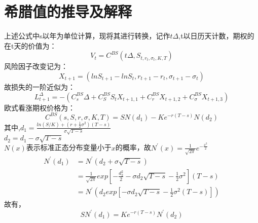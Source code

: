 \documentclass{article}
\begin{document}
\section{希腊值的推导及解释}
上述公式中s以年为单位计算，现将其进行转换，记作$ t\Delta $,t以日历天计数，期权的在t天的价值为：\\
\[V_{t}= C^{BS}(t\Delta, S_{t, r_{t}, \sigma_{t}, K, T})\]
风险因子改变记为：\
\[X_{t+1}= (lnS_{t+1}-lnS_{t}, r_{t+1}-r_{t}, \sigma_{t+1}-\sigma_{t})\]
故损失的一阶近似为：\
\[L^{\Delta}_{t+1}= -(C^{BS}_{s}\Delta + C^{BS}_{S}S_{t}X_{t+1,1}
+ C^{BS}_{r}X_{t+1,2}+ C^{BS}_{\sigma}X_{t+1,3})\]
欧式看涨期权价格为：
\[C^{BS}(s,S,r,\sigma,K,T) = SN(d_{1})-Ke^{-r(T-s)}N(d_{2})\]
其中,$ d_{1}=\frac{ln(S/K)+
	(r+\frac{1}{2}\sigma^{2})(T-s)}{\sigma\sqrt{T-s}}$\\
$d_{2} = d_{1}-\sigma\sqrt{T-s}$\\
$N(x)$表示标准正态分布变量小于$ x $的概率，故$ N^{'}(x)= \frac{1}{\sqrt{2\pi}} e^{-\frac{x^2}{2}}$
\begin{align}
\nonumber N^{'}(d_{1}) & = N^{'}(d_{2}+\sigma\sqrt{T-s})\\
\nonumber  & = \frac{1}{\sqrt{2\pi}}exp[-\frac{d_{2}^2}{2}-\sigma d_{2}\sqrt{T-s}
-\frac{1}{2}\sigma^2](T-s)\\
\nonumber  & =N^{'}(d_{2}exp[-\sigma d_{2}\sqrt{T-s}-\frac{1}{2}\sigma ^{2}(T-s)])
\end{align}
故有，
\[SN^{'}(d_{1}) = Ke^{-r(T-s)}N^{'}(d_{2})\]
\end{document}
